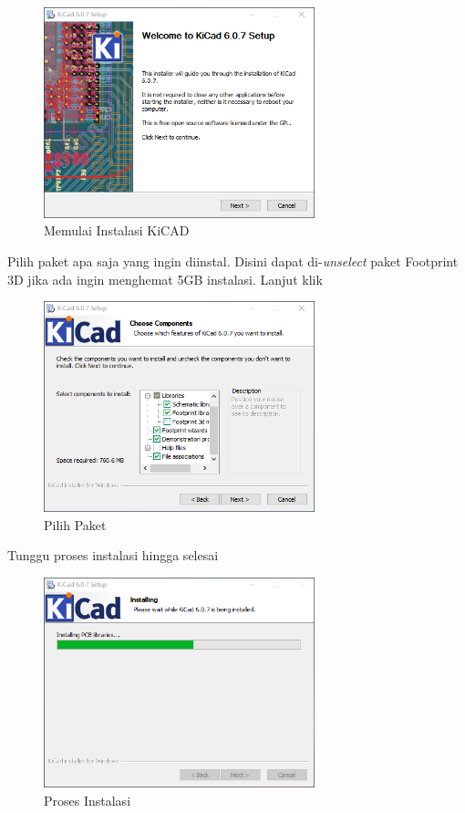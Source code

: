 \documentclass[12pt]{book}
\begin{document}
	\begin{figure}[!ht]
		\centering
		\includegraphics[width=0.7\textwidth]{images/installations/kicad_install_0}
		\caption{Memulai Instalasi KiCAD}
	\end{figure}

	Pilih paket apa saja yang ingin diinstal.
	Disini dapat di-\textit{unselect} paket Footprint 3D jika ada ingin menghemat 5GB instalasi.
	Lanjut klik 

	\begin{figure}[!ht]
		\centering
		\includegraphics[width=0.7\textwidth]{images/installations/kicad_install_1}
		\caption{Pilih Paket}
	\end{figure}

	\newpage
	Tunggu proses instalasi hingga selesai

	\begin{figure}[!ht]
		\centering
		\includegraphics[width=0.7\textwidth]{images/installations/kicad_install_2}
		\caption{Proses Instalasi}
	\end{figure}
\end{document}
